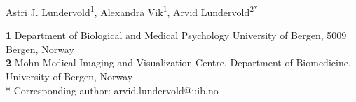 \documentclass[10pt,letterpaper]{article}
\date{}
\begin{document}
\vspace*{0.2in}

\begin{flushleft}
{\Large
\textbf{} %
}
\newline

Astri J. Lundervold\textsuperscript{1},
Alexandra Vik\textsuperscript{1},
Arvid Lundervold\textsuperscript{2*}


\bigskip
\textbf{1} Department of Biological and Medical Psychology University of Bergen, 5009 Bergen, Norway
\\
\textbf{2} Mohn Medical Imaging and Visualization Centre, Department of Biomedicine, University of Bergen, Norway \\



% 
%





* Corresponding author: arvid.lundervold@uib.no


\end{flushleft}
\end{document}
